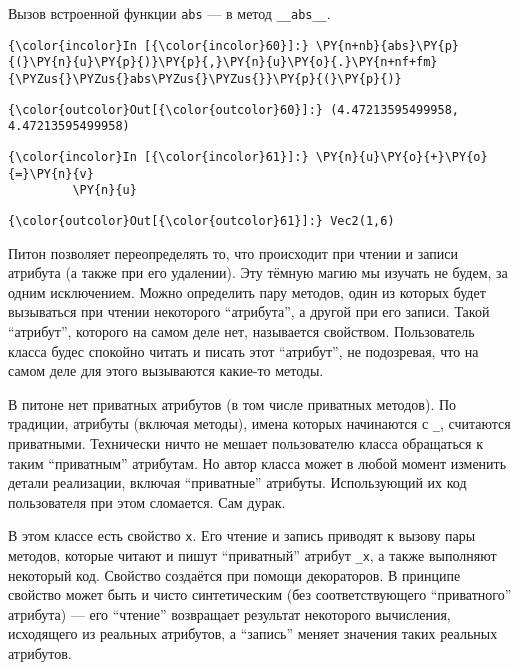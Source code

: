     Вызов встроенной функции \texttt{abs} --- в метод \texttt{\_\_abs\_\_}.

    \begin{Verbatim}[commandchars=\\\{\}]
{\color{incolor}In [{\color{incolor}60}]:} \PY{n+nb}{abs}\PY{p}{(}\PY{n}{u}\PY{p}{)}\PY{p}{,}\PY{n}{u}\PY{o}{.}\PY{n+nf+fm}{\PYZus{}\PYZus{}abs\PYZus{}\PYZus{}}\PY{p}{(}\PY{p}{)}
\end{Verbatim}

            \begin{Verbatim}[commandchars=\\\{\}]
{\color{outcolor}Out[{\color{outcolor}60}]:} (4.47213595499958, 4.47213595499958)
\end{Verbatim}
        
    \begin{Verbatim}[commandchars=\\\{\}]
{\color{incolor}In [{\color{incolor}61}]:} \PY{n}{u}\PY{o}{+}\PY{o}{=}\PY{n}{v}
         \PY{n}{u}
\end{Verbatim}

            \begin{Verbatim}[commandchars=\\\{\}]
{\color{outcolor}Out[{\color{outcolor}61}]:} Vec2(1,6)
\end{Verbatim}
        
    Питон позволяет переопределять то, что происходит при чтении и записи
атрибута (а также при его удалении). Эту тёмную магию мы изучать не
будем, за одним исключением. Можно определить пару методов, один из
которых будет вызываться при чтении некоторого ``атрибута'', а другой
при его записи. Такой ``атрибут'', которого на самом деле нет,
называется свойством. Пользователь класса будес спокойно читать и писать
этот ``атрибут'', не подозревая, что на самом деле для этого вызываются
какие-то методы.

В питоне нет приватных атрибутов (в том числе приватных методов). По
традиции, атрибуты (включая методы), имена которых начинаются с
\texttt{\_}, считаются приватными. Технически ничто не мешает
пользователю класса обращаться к таким ``приватным'' атрибутам. Но автор
класса может в любой момент изменить детали реализации, включая
``приватные'' атрибуты. Использующий их код пользователя при этом
сломается. Сам дурак.

В этом классе есть свойство \texttt{x}. Его чтение и запись приводят к
вызову пары методов, которые читают и пишут ``приватный'' атрибут
\texttt{\_x}, а также выполняют некоторый код. Свойство создаётся при
помощи декораторов. В принципе свойство может быть и чисто синтетическим
(без соответствующего ``приватного'' атрибута) --- его ``чтение''
возвращает результат некоторого вычисления, исходящего из реальных
атрибутов, а ``запись'' меняет значения таких реальных атрибутов.

